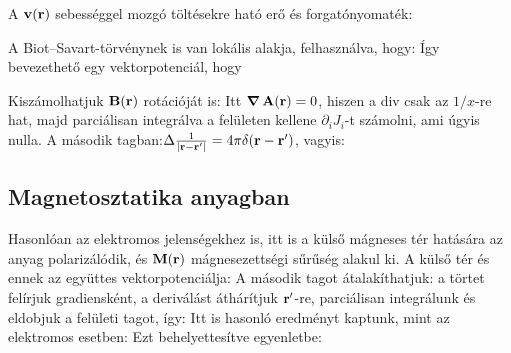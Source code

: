   A $\mathbf{v}(\mathbf{r})$ sebességgel mozgó töltésekre ható erő és forgatónyomaték:
   
   A Biot--Savart-törvénynek is van lokális alakja, felhasználva, hogy:
   Így bevezethető egy vektorpotenciál, hogy 
   
   Kiszámolhatjuk $\mathbf{B}(\mathbf{r})$ rotációját is:
   Itt $\mathop{\boldsymbol{\nabla}}\nolimits\mathbf{A}(\mathbf{r})=0$, hiszen a div csak az $1/x$-re hat, majd parciálisan integrálva a felületen kellene $\partial_i J_i$-t számolni, ami úgyis nulla. A második tagban:$\Delta\frac{1}{\left\lvert\mathbf{r}-\mathbf{r}'\right\rvert} =4\pi\delta(\mathbf{r}-\mathbf{r}')$, vagyis:
   
  \subsection{Magnetosztatika anyagban}\label{ss1:magnetosztatika}
   
   Hasonlóan az elektromos jelenségekhez is, itt is a külső mágneses tér hatására az anyag polarizálódik, és $\mathbf{M}(\mathbf{r})$ mágnesezettségi sűrűség alakul ki. A külső tér és ennek az együttes vektorpotenciálja:
   A második tagot átalakíthatjuk: a törtet felírjuk gradiensként, a deriválást áthárítjuk $\mathbf{r}'$-re, parciálisan integrálunk és eldobjuk a felületi tagot, így:
   Itt is hasonló eredményt kaptunk, mint az elektromos esetben: 
   Ezt behelyettesítve  egyenletbe:
   
